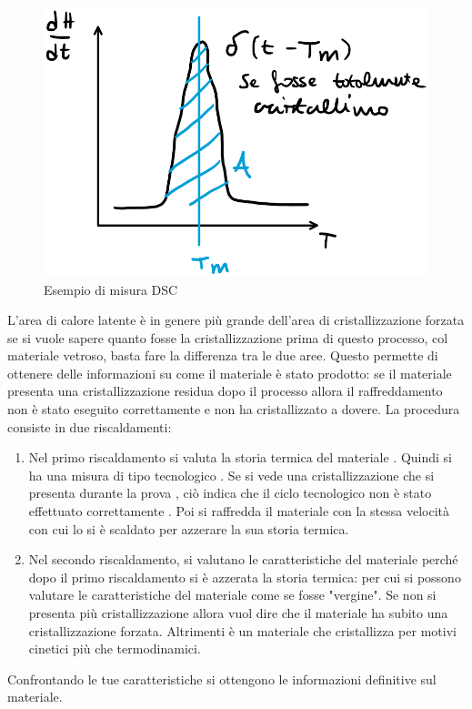 \begin{figure}
\centering
\includegraphics[width = \textwidth]{gfx/DSC}
\caption{Esempio di misura DSC}
\label{fig:DSC}
\end{figure}

L'area di calore latente è in genere più grande dell'area di cristallizzazione forzata se si vuole sapere quanto fosse la cristallizzazione prima di questo processo, col materiale vetroso, basta fare la differenza tra le due aree.
Questo permette di ottenere delle informazioni su come il materiale è stato prodotto: se il materiale presenta una cristallizzazione residua dopo il processo allora il raffreddamento non è stato eseguito correttamente e non ha cristallizzato a dovere.
La procedura consiste in due riscaldamenti:
\begin{enumerate}
\item Nel primo riscaldamento si valuta la storia termica del materiale . Quindi si ha una misura di tipo tecnologico . Se si vede una cristallizzazione che si presenta durante la prova , ciò indica che il ciclo tecnologico non è stato effettuato correttamente . Poi si raffredda il materiale con la stessa velocità con cui lo si è scaldato per azzerare la sua storia termica.
\item Nel secondo riscaldamento, si valutano le caratteristiche del materiale perché dopo il primo riscaldamento si è azzerata la storia termica: per cui si possono valutare le caratteristiche del materiale come se fosse "vergine". Se non si presenta più cristallizzazione allora vuol dire che il materiale ha subito una cristallizzazione forzata. Altrimenti è un materiale che cristallizza per motivi cinetici più che termodinamici.
\end{enumerate}
Confrontando le tue caratteristiche si ottengono le informazioni definitive sul materiale.

